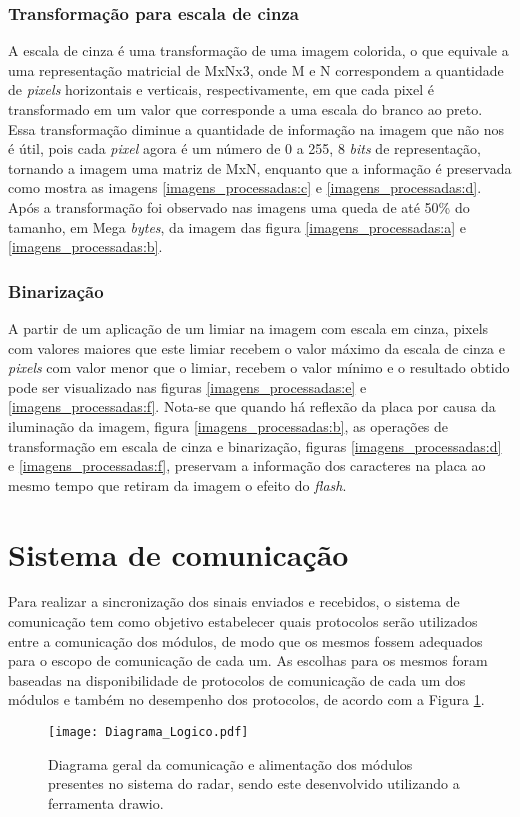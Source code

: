 \subsubsection{Transformação para escala de cinza}
A escala de cinza é uma transformação de uma imagem colorida, o que equivale a uma representação matricial de MxNx3, onde M e N correspondem a quantidade de \emph{pixels} horizontais e verticais, respectivamente, em que cada pixel é transformado em um valor que corresponde a uma escala do branco ao preto. Essa transformação diminue a quantidade de informação na imagem que não nos é útil, pois cada \emph{pixel} agora é um número de 0 a 255, 8 \emph{bits} de representação, tornando a imagem uma matriz de MxN, enquanto que a informação é preservada como mostra as imagens \ref{imagens_processadas:c} e \ref{imagens_processadas:d}. Após a transformação foi observado nas imagens uma queda de até 50\% do tamanho, em Mega \emph{bytes}, da imagem das figura \ref{imagens_processadas:a} e \ref{imagens_processadas:b}.
\subsubsection{Binarização}
A partir de um aplicação de um limiar na imagem com escala em cinza, pixels com valores maiores que este limiar recebem o valor máximo da escala de cinza e \emph{pixels} com valor menor que o limiar, recebem o valor mínimo e o resultado obtido  pode ser visualizado nas figuras \ref{imagens_processadas:e} e \ref{imagens_processadas:f}.
Nota-se que quando há reflexão da placa por causa da iluminação da imagem, figura \ref{imagens_processadas:b}, as operações de transformação em escala de cinza e binarização, figuras \ref{imagens_processadas:d} e \ref{imagens_processadas:f}, preservam a informação dos caracteres na placa ao mesmo tempo que retiram da imagem o efeito do \emph{flash}.
\section{Sistema de comunicação}
Para realizar a sincronização dos sinais enviados e recebidos, o sistema de comunicação tem como objetivo estabelecer quais protocolos serão utilizados entre a comunicação dos módulos, de modo que os mesmos fossem adequados para o escopo de comunicação de cada um.
As escolhas para os mesmos foram baseadas na disponibilidade de protocolos  de comunicação de cada um dos módulos e também no desempenho dos protocolos, de acordo com a Figura \ref{diagrama_logico}.
\begin{figure}[H]
    \centering
    \texttt{[image: Diagrama\_Logico.pdf]}
    \caption{Diagrama geral da comunicação e alimentação dos módulos presentes no sistema do radar, sendo este desenvolvido utilizando a ferramenta drawio. }
    \label{diagrama_logico}
\end{figure}
